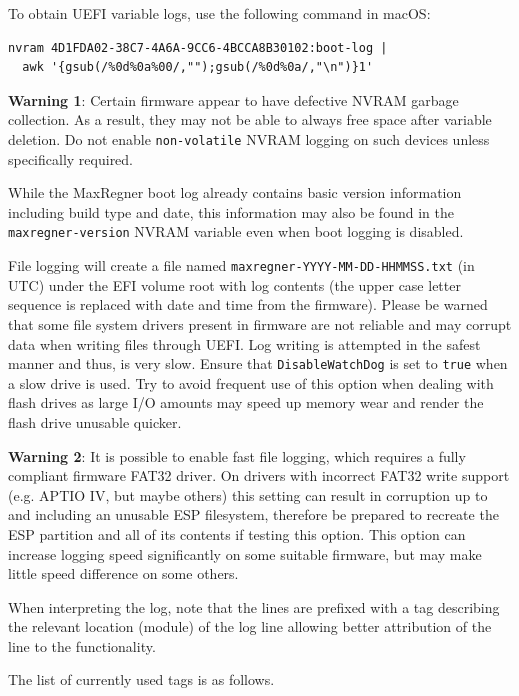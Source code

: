 \documentclass[]{article}
\begin{document}
\begin{enumerate}
  To obtain UEFI variable logs, use the following command in macOS:
\begin{lstlisting}[label=nvramlog, style=ocbash]
nvram 4D1FDA02-38C7-4A6A-9CC6-4BCCA8B30102:boot-log |
  awk '{gsub(/%0d%0a%00/,"");gsub(/%0d%0a/,"\n")}1'
\end{lstlisting}

  \textbf{Warning 1}: Certain firmware appear to have defective NVRAM garbage collection.
  As a result, they may not be able to always free space after variable deletion. Do not
  enable \texttt{non-volatile} NVRAM logging on such devices unless specifically required.

  While the MaxRegner boot log already contains basic version information including build type
  and date, this information may also be found in the \texttt{maxregner-version} NVRAM variable
  even when boot logging is disabled.

  File logging will create a file named \texttt{maxregner-YYYY-MM-DD-HHMMSS.txt} (in UTC) under
  the EFI volume root with log contents (the upper case letter sequence is replaced with date
  and time from the firmware). Please be warned that some file system drivers present in
  firmware are not reliable and may corrupt data when writing files through UEFI. Log
  writing is attempted in the safest manner and thus, is very slow. Ensure that
  \texttt{DisableWatchDog} is set to \texttt{true} when a slow drive is used. Try to
  avoid frequent use of this option when dealing with flash drives as large I/O
  amounts may speed up memory wear and render the flash drive unusable quicker.

  \textbf{Warning 2}: It is possible to enable fast file logging, which requires a fully compliant
  firmware FAT32 driver. On drivers with incorrect FAT32 write support (e.g. APTIO IV, but maybe
  others) this setting can result in corruption up to and including an unusable ESP filesystem,
  therefore be prepared to recreate the ESP partition and all of its contents if testing this option.
  This option can increase logging speed significantly on some suitable firmware, but may make little
  speed difference on some others.

  When interpreting the log, note that the lines are prefixed with a tag describing
  the relevant location (module) of the log line allowing better attribution of the
  line to the functionality.

  The list of currently used tags is as follows.


\end{enumerate}
\end{document}
